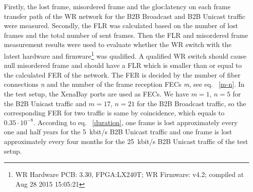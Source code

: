 Firstly, the lost frame, misordered frame and the \gls{glos:latency} on each frame transfer path of the WR network for the B2B Broadcast and B2B Unicast traffic were measured. Secondly, the FLR was calculated based on the number of lost frames and the total number of sent frames. Then the FLR and misordered frame measurement results were used to evaluate whether the WR switch with the latest hardware and firmware\footnote{WR Hardware PCB: 3.30, FPGA:LX240T; WR Firmware: v4.2; compiled at Aug 28 2015 15:05:21} was qualified. A qualified WR switch should cause null misordered frame and should have a FLR which is smaller than or equal to the calculated FER of the network. The FER is decided by the number of fiber connections \textit{n} and the number of the frame reception FECs \textit{m}, see eq. ~\ref{m-n}. In the test setup, the XenaBay ports are used as FECs. We have $m=1$, $n=5$ for the B2B Unicast traffic and $m=17$, $n=21$ for the B2B Broadcast traffic, so the corresponding FER for two traffic is same by coincidence, which equals to $0.35\cdot10^{-8}$. According to eq. ~\ref{duration}, one frame is lost approximately every one and half years for the \SI{5}{kbit/s} B2B Unicast traffic and one frame is lost approximately every four months for the \SI{25}{kbit/s} B2B Unicast traffic of the test setup.    
\renewcommand{\multirowsetup}{\centering} 
